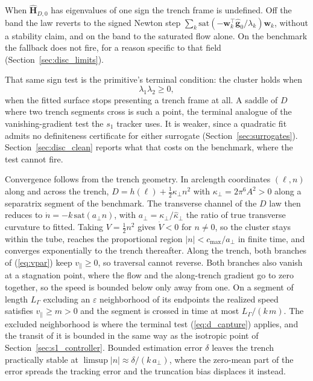 \documentclass[lettersize,journal]{IEEEtran}
\begin{document}
When $\hat{\mathbf{H}}_{D,0}$ has eigenvalues of one sign the trench
frame is undefined. Off the band the law reverts to the signed Newton
step $\sum_k \mathrm{sat}(-\mathbf{w}_k^\top\hat{\mathbf{g}}_0/
\lambda_k)\mathbf{w}_k$, without a stability claim, and on the band to
the saturated flow alone. On the benchmark the fallback does not fire,
for a reason specific to that field (Section~\ref{sec:disc_limits}).

That same sign test is the primitive's terminal condition: the cluster
holds when
\begin{equation}
    \lambda_1 \lambda_2 \geq 0,
    \label{eq:d_capture}
\end{equation}
when the fitted surface stops presenting a trench frame at all. A saddle of $D$ where two trench segments cross is such a point, the terminal analogue of the vanishing-gradient test the $s_1$ tracker uses. It is weaker, since a quadratic fit admits no definiteness certificate for either surrogate (Section~\ref{sec:surrogates}). Section~\ref{sec:disc_clean} reports
what that costs on the benchmark, where the test cannot fire.

Convergence follows from the trench geometry. In arclength coordinates $(\ell, n)$ along and across the trench, $D = h(\ell) + \tfrac{1}{2}\kappa_\perp n^2$ with $\kappa_\perp = 2\pi^6 A^2 > 0$ along a separatrix segment of the benchmark. The transverse channel of the $D$ law then reduces to $\dot{n} = -k\,\mathrm{sat}(a_\perp n)$, with $a_\perp = \kappa_\perp/\hat{\kappa}_\perp$ the ratio of true transverse curvature to fitted. Taking $V = \tfrac{1}{2}n^2$
gives $\dot{V} < 0$ for $n \neq 0$, so the cluster stays within the tube,
reaches the proportional region $|n| < c_{\max}/a_\perp$ in finite time,
and converges exponentially to the trench thereafter. Along the trench,
both branches of (\ref{eq:vpar}) keep $v_\parallel \geq 0$, so traversal
cannot reverse. Both branches also vanish at a stagnation point, where
the flow and the along-trench gradient go to zero together, so the
speed is bounded below only away from one. On a segment of length
$L_\Gamma$ excluding an $\varepsilon$ neighborhood of its endpoints the
realized speed satisfies $v_\parallel \geq m > 0$ and the segment is
crossed in time at most $L_\Gamma/(k\,m)$. The excluded neighborhood is
where the terminal test (\ref{eq:d_capture}) applies, and the transit
of it is bounded in the same way as the isotropic point of
Section~\ref{sec:s1_controller}. Bounded estimation error $\delta$ leaves the
trench practically stable at $\limsup |n| \approx \delta/(k\,a_\perp)$,
where the zero-mean part of the error spreads the tracking error and the
truncation bias displaces it instead.
\end{document}
